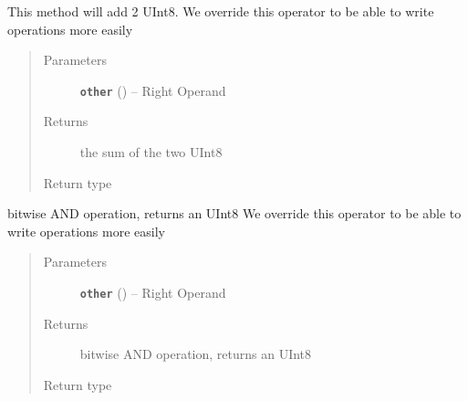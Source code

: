 \documentclass[letterpaper,10pt,english]{sphinxmanual}
\begin{document}
\begin{fulllineitems}

\begin{fulllineitems}
\label{datatypes.integers:datatypes.integers.UInt8.UInt8.__add__}
This method will add 2 UInt8.
We override this operator to be able to write operations more easily
\begin{quote}\begin{description}
\item[{Parameters}] \leavevmode
\textbf{\texttt{other}} ({\hyperref[datatypes.integers:datatypes.integers.UInt8.UInt8]{}}) -- Right Operand

\item[{Returns}] \leavevmode
the sum of the two UInt8

\item[{Return type}] \leavevmode
{\hyperref[datatypes.integers:datatypes.integers.UInt8.UInt8]{}}

\end{description}\end{quote}

\end{fulllineitems}


\begin{fulllineitems}
\label{datatypes.integers:datatypes.integers.UInt8.UInt8.__and__}
bitwise AND operation, returns an UInt8
We override this operator to be able to write operations more easily
\begin{quote}\begin{description}
\item[{Parameters}] \leavevmode
\textbf{\texttt{other}} ({\hyperref[datatypes.integers:datatypes.integers.UInt8.UInt8]{}}) -- Right Operand

\item[{Returns}] \leavevmode
bitwise AND operation, returns an UInt8

\item[{Return type}] \leavevmode
{\hyperref[datatypes.integers:datatypes.integers.UInt8.UInt8]{}}

\end{description}\end{quote}


\end{fulllineitems}
\end{fulllineitems}
\end{document}
